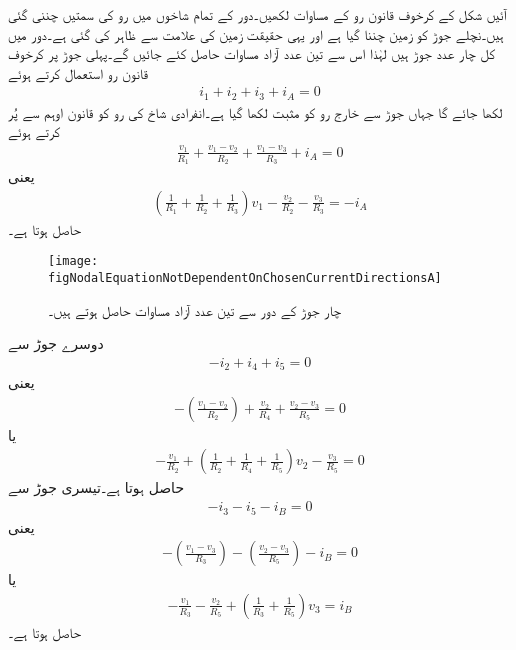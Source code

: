 آئیں شکل  کے کرخوف قانون رو  کے مساوات لکھیں۔دور کے تمام شاخوں میں رو کی سمتیں چننی گئی ہیں۔نچلے جوڑ کو زمین چننا گیا ہے اور یہی حقیقت زمین کی علامت سے ظاہر کی گئی ہے۔دور میں کل چار  عدد جوڑ ہیں لہٰذا اس سے تین  عدد آزاد مساوات حاصل کئے جائیں گے۔پہلی جوڑ پر کرخوف قانون رو استعمال کرتے ہوئے
\begin{align*}
i_1+i_2+i_3+i_A=0
\end{align*}
لکھا جائے گا جہاں جوڑ سے خارج رو کو مثبت لکھا گیا ہے۔انفرادی شاخ کی رو کو قانون اوہم سے پُر کرتے ہوئے
\begin{align*}
\frac{v_1}{R_1}+\frac{v_1-v_2}{R_2}+\frac{v_1-v_3}{R_3}+i_A=0
\end{align*}
یعنی
\begin{align}\label{مساوات_جوڑ_چار_جوڑ_تین_آزاد_الف}
\left(\frac{1}{R_1}+\frac{1}{R_2}+\frac{1}{R_3}\right)v_1-\frac{v_2}{R_2}-\frac{v_3}{R_3}=-i_A
\end{align}
حاصل ہوتا ہے۔
\begin{figure}
\centering
\texttt{[image: figNodalEquationNotDependentOnChosenCurrentDirectionsA]}
\caption{چار جوڑ کے دور سے تین عدد آزاد مساوات حاصل ہوتے ہیں۔}
\label{شکل_جوڑ_چار_جوڑ_تین_آزاد_مساوات_الف}
\end{figure}
دوسرے جوڑ سے
\begin{align*}
-i_2+i_4+i_5=0
\end{align*}
یعنی
\begin{align*}
-\left(\frac{v_1-v_2}{R_2}\right)+\frac{v_2}{R_4}+\frac{v_2-v_3}{R_5}=0
\end{align*}
یا
\begin{align}\label{مساوات_جوڑ_چار_جوڑ_تین_آزاد_ب}
-\frac{v_1}{R_2}+\left(\frac{1}{R_2}+\frac{1}{R_4}+\frac{1}{R_5}\right)v_2-\frac{v_3}{R_5}=0
\end{align}
حاصل ہوتا ہے۔تیسری جوڑ سے
\begin{align*}
-i_3-i_5-i_B=0
\end{align*}
یعنی
\begin{align*}
-\left(\frac{v_1-v_3}{R_3}\right)-\left(\frac{v_2-v_3}{R_5}\right)-i_B=0
\end{align*}
یا
\begin{align}\label{مساوات_جوڑ_چار_جوڑ_تین_آزاد_پ}
-\frac{v_1}{R_3}-\frac{v_2}{R_5}+\left(\frac{1}{R_3}+\frac{1}{R_5}\right)v_3=i_B
\end{align}
حاصل ہوتا ہے۔

